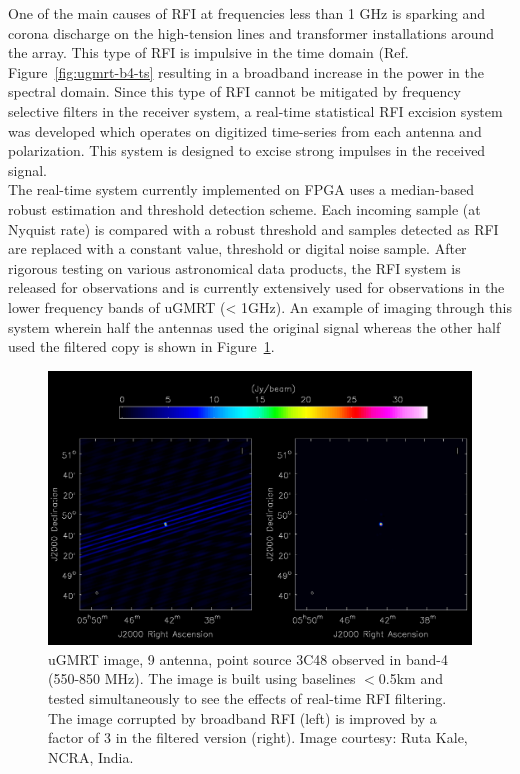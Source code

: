 \begin{itemize}
One of the main causes of RFI at frequencies less than 1 GHz is sparking and corona discharge on the high-tension lines and transformer installations around the array. This type of RFI is impulsive in the time domain (Ref. Figure~\ref{fig:ugmrt-b4-ts} resulting in a broadband increase in the power in the spectral domain. Since this type of RFI cannot be mitigated by frequency selective filters in the receiver system, a real-time statistical RFI excision system was developed which operates on digitized time-series from each antenna and polarization. This system is designed to excise strong impulses in the received signal. \\

The real-time system currently implemented on FPGA \cite{buch2019real} uses a median-based robust estimation and threshold detection scheme. Each incoming sample (at Nyquist rate) is compared with a robust threshold and samples detected as RFI are replaced with a constant value, threshold or digital noise sample. After rigorous testing on various astronomical data products, the RFI system is released for observations and is currently extensively used for observations in the lower frequency bands of uGMRT (< 1GHz). An example of imaging through this system wherein half the antennas used the original signal whereas the other half used the filtered copy \cite{buch2022performance} is shown in Figure~\ref{fig:ugmrt-b4-image}. \\

\begin{figure}
    \includegraphics[scale=0.5]{Hardware Excision Techniques/figures/band4_point_source_rfi_filtering.png}
    \caption{uGMRT image, 9 antenna, point source 3C48 observed in band-4 (550-850 MHz). The image is built using baselines $<$0.5km and tested simultaneously to see the effects of real-time RFI filtering. The image corrupted by broadband RFI (left) is improved by a factor of 3 in the filtered version (right). Image courtesy: Ruta Kale, NCRA, India.
}
    \label{fig:ugmrt-b4-image}
\end{figure}


\end{itemize}
